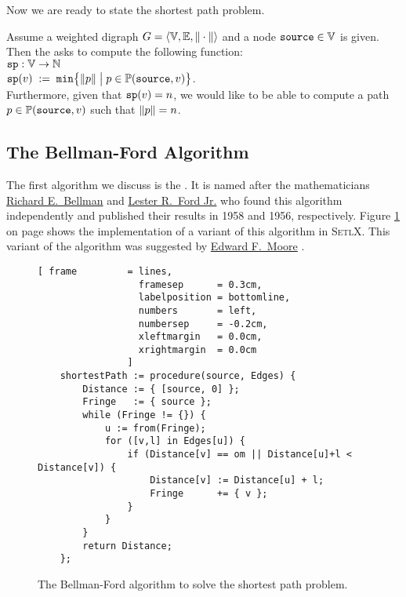 \noindent
Now we are ready to state the shortest path problem.

\begin{Definition} \lb
  Assume a weighted digraph  
  $G = \langle {\mathbb V}, {\mathbb E}, \|\cdot\| \rangle$ 
  and a node $\mbox{\tt source} \in {\mathbb V}$ is given.  Then the  asks to compute
  the following function:
  \\[0.2cm]
  \hspace*{1.3cm} $\mathtt{sp}: {\mathbb V} \rightarrow {\mathbb N}$ \\[0.1cm]
  \hspace*{1.3cm} $\mathtt{sp}(v) \;:=\; \mathtt{min}\bigl\{ \|p\| \bigm| p \in {\mathbb P}(\mbox{\tt source},v) \bigr\}$.
  \\[0.2cm]
  Furthermore, given that $\mathtt{sp}(v) = n$, we would like to be able to compute a path 
  $p \in {\mathbb P}(\mbox{\tt source},v)$ such that $\|p\| = n$.
  \eox
\end{Definition}

\subsection{The Bellman-Ford Algorithm}
The first algorithm we discuss is the
\href{https://en.wikipedia.org/wiki/Bellman-Ford_algorithm}{}.
It is named after the mathematicians 
\href{https://en.wikipedia.org/wiki/Richard_E._Bellman}{Richard E.~Bellman} \cite{bellman:58} and 
\href{https://en.wikipedia.org/wiki/L._R._Ford_Jr.}{Lester R.~Ford Jr.} \cite{ford:56} who found this algorithm
independently and published their results in 1958 and 1956, respectively.  Figure
\ref{fig:moore.stlx} on page \pageref{fig:moore.stlx} shows the implementation of a variant of this 
algorithm in \textsc{SetlX}.  This variant of the algorithm was suggested by 
\href{https://en.wikipedia.org/wiki/Edward_F._Moore}{Edward F.~Moore} \cite{moore:59}.


\begin{figure}[!ht]
  \centering
\begin{Verbatim}[ frame         = lines, 
                  framesep      = 0.3cm, 
                  labelposition = bottomline,
                  numbers       = left,
                  numbersep     = -0.2cm,
                  xleftmargin   = 0.0cm,
                  xrightmargin  = 0.0cm
                ]
    shortestPath := procedure(source, Edges) {
        Distance := { [source, 0] };
        Fringe   := { source };
        while (Fringe != {}) {
            u := from(Fringe);
            for ([v,l] in Edges[u]) {
                if (Distance[v] == om || Distance[u]+l < Distance[v]) {
                    Distance[v] := Distance[u] + l;
                    Fringe      += { v };
                }
            }
        }
        return Distance;
    };
\end{Verbatim}
\vspace*{-0.3cm}
  \caption{The Bellman-Ford algorithm to solve the shortest path problem.}
  \label{fig:moore.stlx}
\end{figure} 

